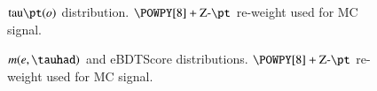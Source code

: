 \begin{figure}[h!tbp]
	\centering
	\hfill
	\caption{$\text{tau}\pt(o)$ distribution. $\POWPY[8]+\text{Z-}\pt$ re-weight used for MC signal.}
	\label{AFig6S}
\end{figure} 

\begin{figure}[h!tbp]
	\centering
	\hfill
	\caption{$m(e,\tauhad)$ and eBDTScore distributions. $\POWPY[8]+\text{Z-}\pt$ re-weight used for MC signal.}
	\label{AFig7P}
\end{figure} 

